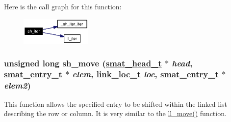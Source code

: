 Here is the call graph for this function:\begin{figure}[H]
\begin{center}
\leavevmode
\includegraphics[width=99pt]{group__dbprim__smat_ga21_cgraph}
\end{center}
\end{figure}
\hypertarget{group__dbprim__smat_ga19}{
\subsubsection[sh\_\-move]{\setlength{\rightskip}{0pt plus 5cm}unsigned long sh\_\-move (\hyperlink{struct__smat__head__s}{smat\_\-head\_\-t} $\ast$ {\em head}, \hyperlink{struct__smat__entry__s}{smat\_\-entry\_\-t} $\ast$ {\em elem}, \hyperlink{group__dbprim__link_ga4}{link\_\-loc\_\-t} {\em loc}, \hyperlink{struct__smat__entry__s}{smat\_\-entry\_\-t} $\ast$ {\em elem2})}}
\label{group__dbprim__smat_ga19}


This function allows the specified entry to be shifted within the linked list describing the row or column. It is very similar to the \hyperlink{group__dbprim__link_ga7}{ll\_\-move()} function.

